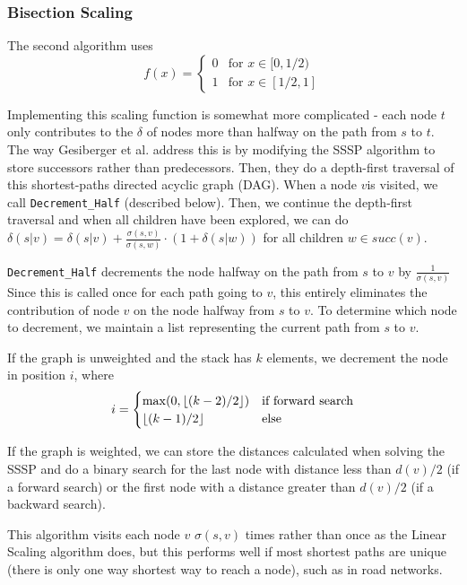 \documentclass[a4paper,12pt]{article}
\DeclarePairedDelimiter\floor{\lfloor}{\rfloor}
\begin{document}
\subsubsection{Bisection Scaling}
The second algorithm uses \begin{equation}
f(x) = \begin{cases}
0 & \text{for } x \in [0,1/2)\\
1 & \text{for } x \in [1/2,1]
\end{cases}
\end{equation}

Implementing this scaling function is somewhat more complicated - each node $t$ only contributes to the $\delta$ of nodes more than halfway on the path from $s$ to $t$. The way Gesiberger et al. address this is by modifying the SSSP algorithm to store successors rather than predecessors. Then, they do a depth-first traversal of this shortest-paths directed acyclic graph (DAG). When a node $v$is visited, we call \texttt{Decrement\_Half} (described below). Then, we continue the depth-first traversal and when all children have been explored, we can do $\delta(s|v) = \delta(s|v) + \frac{\sigma(s,v)}{\sigma(s,w)} \cdot (1+\delta(s|w))$ for all children $w \in succ(v)$.

\texttt{Decrement\_Half} decrements the node halfway on the path from $s$ to $v$ by $\frac{1}{\sigma(s,v)}$ Since this is called once for each path going to $v$, this entirely eliminates the contribution of node $v$ on the node halfway from $s$ to $v$. To determine which node to decrement, we maintain a list representing the current path from $s$ to $v$. 

If the graph is unweighted and the stack has $k$ elements, we decrement the node in position $i$, where\begin{equation}
i = \begin{cases}
\max(0,\floor*{(k-2)/2}) & \text{if forward search}\\
\floor*{(k-1)/2} & \text{else}

\end{cases}
\end{equation}

If the graph is weighted, we can store the distances calculated when solving the SSSP and do a binary search for the last node with distance less than $d(v)/2$ (if a forward search) or the first node with a distance greater than $d(v)/2$ (if a backward search).

This algorithm visits each node $v$ $\sigma(s,v)$ times rather than once as the Linear Scaling algorithm does, but this performs well if most shortest paths are unique (there is only one way shortest way to reach a node), such as in road networks.
\end{document}
